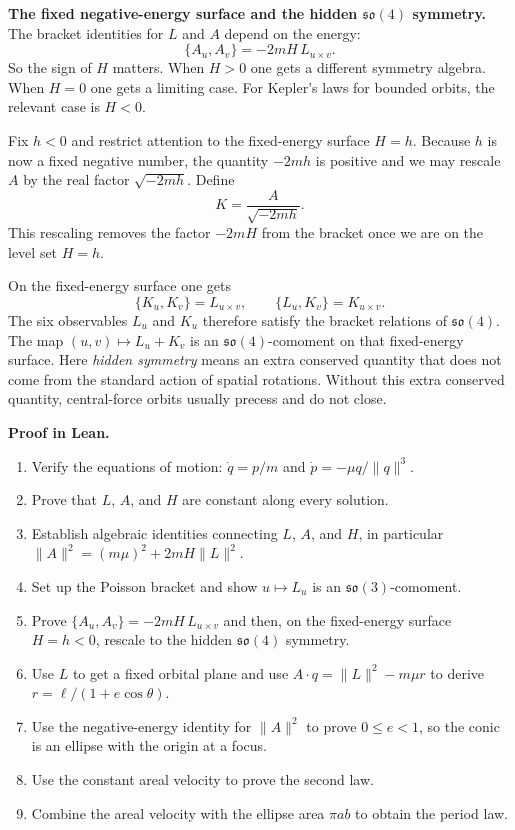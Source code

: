 \medskip
\noindent\textbf{The fixed negative-energy surface and the hidden $\mathfrak{so}(4)$ symmetry.}
The bracket identities for $L$ and $A$ depend on the energy:
\[
  \{A_u, A_v\} = -2mH\,L_{u \times v}.
\]
So the sign of $H$ matters.
When $H > 0$ one gets a different symmetry algebra.
When $H = 0$ one gets a limiting case.
For Kepler's laws for bounded orbits, the relevant case is $H < 0$.

Fix $h < 0$ and restrict attention to the fixed-energy surface $H = h$.
Because $h$ is now a fixed negative number, the quantity $-2mh$ is positive and we may rescale $A$ by the real factor $\sqrt{-2mh}$.
Define
\[
  K = \frac{A}{\sqrt{-2mh}}.
\]
This rescaling removes the factor $-2mH$ from the bracket once we are on the level set $H = h$.

On the fixed-energy surface one gets
\[
  \{K_u, K_v\} = L_{u \times v}, \qquad \{L_u, K_v\} = K_{u \times v}.
\]
The six observables $L_u$ and $K_u$ therefore satisfy the bracket relations of $\mathfrak{so}(4)$.
The map $(u, v) \mapsto L_u + K_v$ is an $\mathfrak{so}(4)$-comoment on that fixed-energy surface.
Here \emph{hidden symmetry} means an extra conserved quantity that does not come from the standard action of spatial rotations.
Without this extra conserved quantity, central-force orbits usually precess and do not close.

\medskip
\noindent\textbf{Proof in Lean.}
\begin{enumerate}
  \item Verify the equations of motion: $\dot q = p/m$ and $\dot p = -\mu q/\|q\|^3$.
  \item Prove that $L$, $A$, and $H$ are constant along every solution.
  \item Establish algebraic identities connecting $L$, $A$, and $H$, in particular $\|A\|^2 = (m\mu)^2 + 2mH\|L\|^2$.
  \item Set up the Poisson bracket and show $u \mapsto L_u$ is an $\mathfrak{so}(3)$-comoment.
  \item Prove $\{A_u, A_v\} = -2mH\,L_{u \times v}$ and then, on the fixed-energy surface $H = h < 0$, rescale to the hidden $\mathfrak{so}(4)$ symmetry.
  \item Use $L$ to get a fixed orbital plane and use $A \cdot q = \|L\|^2 - m\mu r$ to derive $r = \ell/(1 + e\cos\theta)$.
  \item Use the negative-energy identity for $\|A\|^2$ to prove $0 \le e < 1$, so the conic is an ellipse with the origin at a focus.
  \item Use the constant areal velocity to prove the second law.
  \item Combine the areal velocity with the ellipse area $\pi ab$ to obtain the period law.
\end{enumerate}

